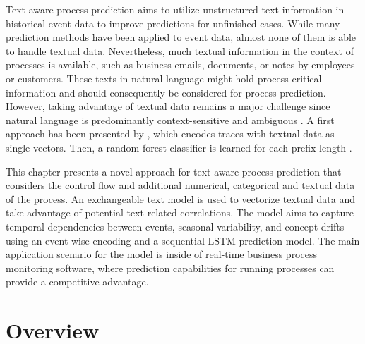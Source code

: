 Text-aware process prediction aims to utilize unstructured text information in historical event data to improve predictions for unfinished cases.
While many prediction methods have been applied to event data, almost none of them is able to handle textual data.
Nevertheless, much textual information in the context of processes is available, such as business emails, documents, or notes by employees or customers.
These texts in natural language might hold process-critical information and should consequently be considered for process prediction.
However, taking advantage of textual data remains a major challenge since natural language is predominantly context-sensitive and ambiguous \cite{textminingissues}.
A first approach has been presented by \citeauthor{DBLP:conf/bpm/TeinemaaDMF16}, which encodes traces with textual data as single vectors.
Then, a random forest classifier is learned for each prefix length \cite{DBLP:conf/bpm/TeinemaaDMF16}.

This chapter presents a novel approach for text-aware process prediction that considers the control flow and additional numerical, categorical and textual data of the process.
An exchangeable text model is used to vectorize textual data and take advantage of potential text-related correlations.
The model aims to capture temporal dependencies between events, seasonal variability, and concept drifts using an event-wise encoding and a sequential LSTM prediction model.
The main application scenario for the model is inside of real-time business process monitoring software, where prediction capabilities for running processes can provide a competitive advantage.

\section{Overview}\label{sec:overview}

